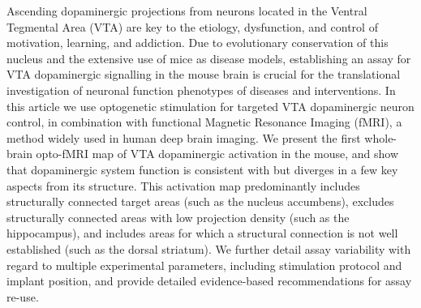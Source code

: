 Ascending dopaminergic projections from neurons located in the Ventral Tegmental Area (VTA) are key to the etiology, dysfunction, and control of motivation, learning, and addiction.
Due to evolutionary conservation of this nucleus and the extensive use of mice as disease models, establishing an assay for VTA dopaminergic signalling in the mouse brain is crucial for the translational investigation of neuronal function phenotypes of diseases and interventions.
In this article we use optogenetic stimulation for targeted VTA dopaminergic neuron control, in combination with functional Magnetic Resonance Imaging (fMRI), a method widely used in human deep brain imaging.
We present the first whole-brain opto-fMRI map of VTA dopaminergic activation in the mouse, and show that dopaminergic system function is consistent with but diverges in a few key aspects from its structure.
This activation map predominantly includes structurally connected target areas (such as the nucleus accumbens), excludes structurally connected areas with low projection density (such as the hippocampus), and includes areas for which a structural connection is not well established (such as the dorsal striatum).
We further detail assay variability with regard to multiple experimental parameters, including stimulation protocol and implant position, and provide detailed evidence-based recommendations for assay re-use.
